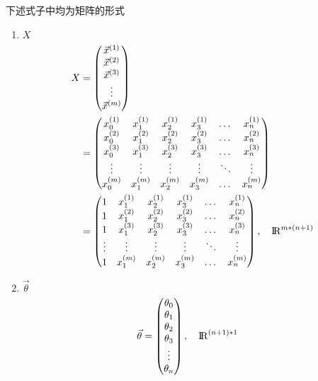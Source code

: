 下述式子中均为矩阵的形式 \\
\begin{enumerate}
\item $X$
\begin{equation} \begin{aligned}
	X & = \left(\begin{matrix}
			\vec{x}^{(1)} \\ \vec{x}^{(2)} \\ \vec{x}^{(3)} \\ \vdots \\ \vec{x}^{(m)}
		\end{matrix}\right) \\
	& = \left( \begin{matrix}
			x_0^{(1)} & x_1^{(1)} & x_2^{(1)} & x_3^{(1)} & \dots & x_n^{(1)} \\
			x_0^{(2)} & x_1^{(2)} & x_2^{(2)} & x_3^{(2)} & \dots & x_n^{(2)} \\
			x_0^{(3)} & x_1^{(3)} & x_2^{(3)} & x_3^{(3)} & \dots & x_n^{(3)} \\
			\vdots    & \vdots    & \vdots    & \vdots    & \ddots & \vdots   \\
			x_0^{(m)} & x_1^{(m)} & x_2^{(m)} & x_3^{(m)} & \dots & x_n^{(m)} \\
			\end{matrix}\right) \\
	& = \left(\begin{matrix}
			1 & x_1^{(1)} & x_2^{(1)} & x_3^{(1)} & \dots & x_n^{(1)} \\
			1 & x_1^{(2)} & x_2^{(2)} & x_3^{(2)} & \dots & x_n^{(2)} \\
			1 & x_1^{(3)} & x_2^{(3)} & x_3^{(3)} & \dots & x_n^{(3)} \\
			\vdots    & \vdots    & \vdots    & \vdots    & \ddots & \vdots   \\
			1 & x_1^{(m)} & x_2^{(m)} & x_3^{(m)} & \dots & x_n^{(m)} \\
		\end{matrix}\right), \quad {\rm I\!R}^{{m*(n+1)}}
\end{aligned} \end{equation}

\item $\vec{\theta}$
\begin{equation} \begin{aligned}
	\vec{\theta} & = \left(\begin{matrix}
			\theta_0 \\ \theta_1 \\ \theta_2 \\ \theta_3 \\ \vdots \\ \theta_n \\
		\end{matrix}\right), \quad {\rm I\!R}^{{(n+1)*1}}
\end{aligned}\end{equation}




\end{enumerate}
